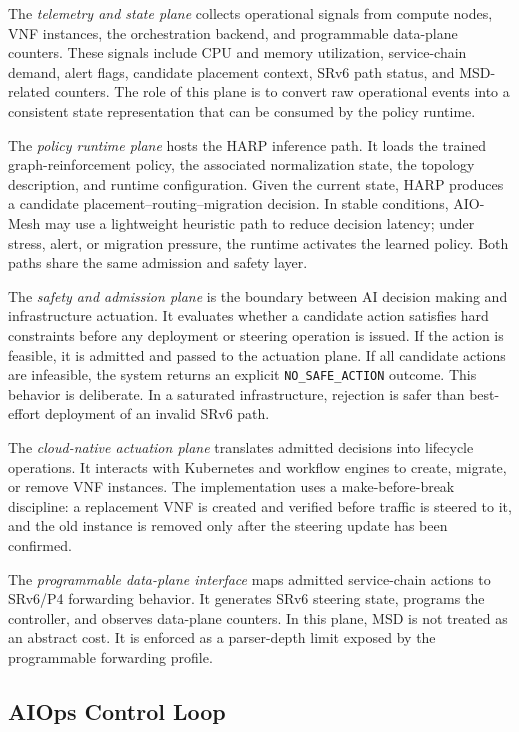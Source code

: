 \documentclass[final,5p]{elsarticle}
\begin{document}
The \textit{telemetry and state plane} collects operational signals from compute nodes, VNF instances, the orchestration backend, and programmable data-plane counters. These signals include CPU and memory utilization, service-chain demand, alert flags, candidate placement context, SRv6 path status, and MSD-related counters. The role of this plane is to convert raw operational events into a consistent state representation that can be consumed by the policy runtime.

The \textit{policy runtime plane} hosts the HARP inference path. It loads the trained graph-reinforcement policy, the associated normalization state, the topology description, and runtime configuration. Given the current state, HARP produces a candidate placement--routing--migration decision. In stable conditions, AIO-Mesh may use a lightweight heuristic path to reduce decision latency; under stress, alert, or migration pressure, the runtime activates the learned policy. Both paths share the same admission and safety layer.

The \textit{safety and admission plane} is the boundary between AI decision making and infrastructure actuation. It evaluates whether a candidate action satisfies hard constraints before any deployment or steering operation is issued. If the action is feasible, it is admitted and passed to the actuation plane. If all candidate actions are infeasible, the system returns an explicit \texttt{NO\_SAFE\_ACTION} outcome. This behavior is deliberate. In a saturated infrastructure, rejection is safer than best-effort deployment of an invalid SRv6 path.

The \textit{cloud-native actuation plane} translates admitted decisions into lifecycle operations. It interacts with Kubernetes and workflow engines to create, migrate, or remove VNF instances. The implementation uses a make-before-break discipline: a replacement VNF is created and verified before traffic is steered to it, and the old instance is removed only after the steering update has been confirmed.

The \textit{programmable data-plane interface} maps admitted service-chain actions to SRv6/P4 forwarding behavior. It generates SRv6 steering state, programs the controller, and observes data-plane counters. In this plane, MSD is not treated as an abstract cost. It is enforced as a parser-depth limit exposed by the programmable forwarding profile.

\subsection{AIOps Control Loop}
\label{subsec:aiops_control_loop}
\end{document}
